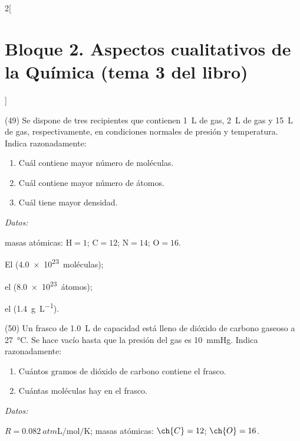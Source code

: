 \documentclass[10pt]{article}
\newenvironment{gexdatos}{
      \vspace{2pt}\noindent\textit{Datos: }
    }{\vspace{5pt}}
\begin{document}
\begin{multicols}{2}[
    \section{Bloque 2. Aspectos cualitativos de la Química (tema 3 del libro)}
  ]
\begin{exercise}[
    tags    = {},
    topics  = {química,química básica},
    source  = {FQ 1B MGH 2016, p86, e49},
  ]
  (49) Se dispone de tres recipientes que contienen \SI{1}{\liter} de  gas, \SI{2}{\liter} de  gas y \SI{15}{\liter} de  gas, respectivamente, en condiciones normales de presión y temperatura. Indica razonadamente:

  \begin{enumerate}
    \item Cuál contiene mayor número de moléculas.
    \item Cuál contiene mayor número de átomos.
    \item Cuál tiene mayor densidad.
  \end{enumerate}

  \begin{gexdatos}
    masas atómicas: \( \textrm{H} = 1 \); \( \textrm{C} = 12 \); \( \textrm{N} = 14 \); \( \textrm{O} = 16 \).
  \end{gexdatos}
\end{exercise}

\begin{solution}
  \begin{enumerate*}
    \item El  (\SI{4.0e23}{moléculas});
    \item el  (\SI{8.0e23}{átomos});
    \item el  (\SI{1.4}{\gram\per\liter}).
  \end{enumerate*}
\end{solution}





\begin{exercise}[
    tags    = {},
    topics  = {química,química básica},
    source  = {FQ 1B MGH 2016, p86, e50},
  ]
  (50) Un frasco de \SI{1.0}{\liter} de capacidad está lleno de dióxido de carbono gaseoso a \SI{27}{\celsius}. Se hace vacío hasta que la presión del
  gas es \SI{10}{\mmHg}. Indica razonadamente:

  \begin{enumerate}
    \item Cuántos gramos de dióxido de carbono contiene el frasco.
    \item Cuántas moléculas hay en el frasco.
  \end{enumerate}

  \begin{gexdatos}
    \( R = \SI{0.082}{atm \liter\per\mole\per\kelvin} \); masas atómicas: \( \ch{C} = 12 \); \( \ch{O} = 16 \).
  \end{gexdatos}
\end{exercise}


\end{multicols}
\end{document}
